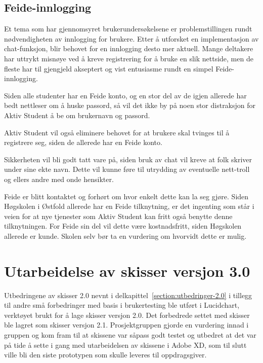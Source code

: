 \subsection{Feide-innlogging}
\label{section:feide}

Et tema som har gjennomsyret brukerundersøkelsene er problemstillingen rundt nødvendigheten av innlogging for brukere. Etter å utforsket en implementasjon av chat-funksjon, blir behovet for en innlogging desto mer aktuell. Mange deltakere har uttrykt misnøye ved å kreve registrering for å bruke en slik nettside, men de fleste har til gjengjeld akseptert og vist entusiasme rundt en simpel Feide-innlogging.

Siden alle studenter har en Feide konto, og en stor del av de igjen allerede har bedt nettleser om å huske passord, så vil det ikke by på noen stor distraksjon for Aktiv Student å be om brukernavn og passord.

Aktiv Student vil også eliminere behovet for at brukere skal tvinges til å registrere seg, siden de allerede har en Feide konto.

Sikkerheten vil bli godt tatt vare på, siden bruk av chat vil kreve at folk skriver under sine ekte navn. Dette vil kunne føre til utrydding av eventuelle nett-troll og ellers andre med onde hensikter.

Feide er blitt kontaktet og forhørt om hvor enkelt dette kan la seg gjøre. Siden Høgskolen i Østfold allerede har en Feide tilknytning, er det ingenting som står i veien for at nye tjenester som Aktiv Student kan fritt også benytte denne tilknytningen. For Feide sin del vil dette være kostnadsfritt, siden Høgskolen allerede er kunde. Skolen selv bør ta en vurdering om hvorvidt dette er mulig.


\section{Utarbeidelse av skisser versjon 3.0}

Utbedringene av skisser 2.0 nevnt i delkapittel~\ref{section:utbedringer-2.0} i tillegg til andre små forbedringer med basis i brukertesting ble utført i Lucidchart, verktøyet brukt for å lage skisser versjon 2.0. Det forbedrede settet med skisser ble lagret som skisser versjon 2.1. Prosjektgruppen gjorde en vurdering innad i gruppen og kom fram til at skissene var såpass godt testet og utbedret at det var på tide å sette i gang med utarbeidelsen av skissene i Adobe XD, som til slutt ville bli den siste prototypen som skulle leveres til oppdragsgiver.

